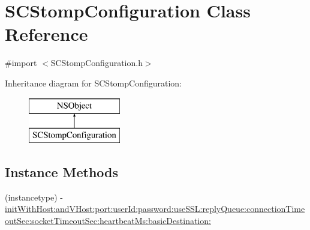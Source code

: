 \hypertarget{interface_s_c_stomp_configuration}{}\section{S\+C\+Stomp\+Configuration Class Reference}
\label{interface_s_c_stomp_configuration}


{\ttfamily \#import $<$S\+C\+Stomp\+Configuration.\+h$>$}

Inheritance diagram for S\+C\+Stomp\+Configuration\+:\begin{figure}[H]
\begin{center}
\leavevmode
\includegraphics[height=2.000000cm]{interface_s_c_stomp_configuration}
\end{center}
\end{figure}
\subsection*{Instance Methods}
\begin{DoxyCompactItemize}
\item 
(instancetype) -\/ \hyperlink{interface_s_c_stomp_configuration_aa0ee1aa71a9be46d8a3b7724f4e22bb4}{init\+With\+Host\+:and\+V\+Host\+:port\+:user\+Id\+:password\+:use\+S\+S\+L\+:reply\+Queue\+:connection\+Timeout\+Sec\+:socket\+Timeout\+Sec\+:heartbeat\+Ms\+:basic\+Destination\+:}
\end{DoxyCompactItemize}
